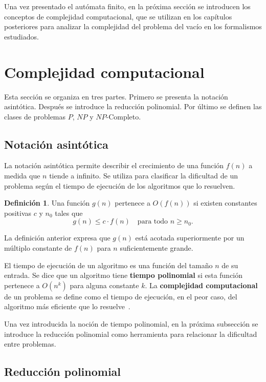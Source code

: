 \documentclass{report}
\theoremstyle{definition}
\newtheorem{definicion}{Definición}[chapter]
\theoremstyle{plain}
\theoremstyle{remark}
\begin{document}
Una vez presentado el autómata finito, en la próxima sección se
introducen los conceptos de complejidad computacional, que se utilizan
en los capítulos posteriores para analizar la complejidad del problema
del vacío en los formalismos estudiados.

\section{Complejidad computacional}
\label{sec:complejidad}

Esta sección se organiza en tres partes. Primero se presenta la
notación asintótica. Después se introduce la reducción polinomial.
Por último se definen las clases de problemas $P$, $NP$ y
$NP$-Completo.

\subsection{Notación asintótica}

La notación asintótica permite describir el crecimiento de una función
$f(n)$ a medida que $n$ tiende a infinito. Se utiliza para clasificar
la dificultad de un problema según el tiempo de ejecución de los
algoritmos que lo resuelven.

\begin{definicion}
Una función $g(n)$ pertenece a $O(f(n))$ si existen constantes positivas
$c$ y $n_0$ tales que
\[
  g(n) \le c \cdot f(n) \quad \text{para todo } n \ge n_0.
\]
\end{definicion}

La definición anterior expresa que $g(n)$ está acotada superiormente
por un múltiplo constante de $f(n)$ para $n$ suficientemente grande.

El tiempo de ejecución de un algoritmo es una función del tamaño $n$
de su entrada. Se dice que un algoritmo tiene \textbf{tiempo
polinomial} si esta función pertenece a $O(n^k)$ para alguna
constante $k$. La \textbf{complejidad computacional} de un problema
se define como el tiempo de ejecución, en el peor caso, del algoritmo
más eficiente que lo resuelve~\cite{hopcroft2006introduction}.

Una vez introducida la noción de tiempo polinomial, en la próxima
subsección se introduce la reducción polinomial como herramienta para
relacionar la dificultad entre problemas.

\subsection{Reducción polinomial}
\label{sec:reduccion}
\end{document}

